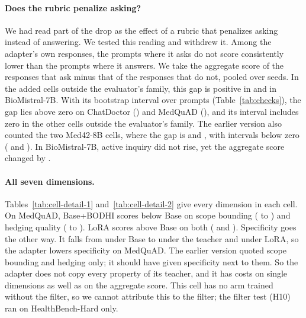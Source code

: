 \documentclass{article}
\newcommand{\bodhi}{BODHI}
\newcommand{\hbhard}{HealthBench-Hard}
\begin{document}
\paragraph{Does the rubric penalize asking?} We had read part of the drop as the effect of a
rubric that penalizes asking instead of answering. We tested this reading and withdrew it. Among
the adapter's own responses, the prompts where it asks do not score consistently lower than the
prompts where it answers. We take the aggregate score of the responses that ask minus that of
the responses that do not, pooled over seeds. In the \statGroupAddedOutsideFamilyCells{} added cells outside the evaluator's
family, this gap is positive in \statGroupAddedOutsideFamilyAskersGapLoRAUp{} and
\statHBBioMistralJulAskersGapLoRA{} in BioMistral-7B. With its bootstrap interval over prompts
(Table~\ref{tab:checks}), the gap lies above zero on ChatDoctor
(\statCDMistralJulAskersGapLoRACI) and MedQuAD (\statMQMistralJulAskersGapLoRACI), and its interval
includes zero in the other cells outside the evaluator's family. The earlier version also counted the two
Med42-8B cells, where the gap is \statHBMedFortyTwoJulAskersGapLoRA{} and
\statCDMedFortyTwoJulAskersGapLoRA, with intervals below zero
(\statHBMedFortyTwoJulAskersGapLoRACI{} and \statCDMedFortyTwoJulAskersGapLoRACI). In BioMistral-7B,
active inquiry did not rise, yet the aggregate score changed by \statHBBioMistralJulRubricScoreLoRAvsBaseDiff.

\paragraph{All seven dimensions.} Tables~\ref{tab:cell-detail-1} and~\ref{tab:cell-detail-2}
give every dimension in each cell. On MedQuAD, Base+\bodhi{}
scores below Base on scope bounding (\statMQMistralJulScopeBoundingBase{} to
\statMQMistralJulScopeBoundingBaseBodhi) and hedging quality
(\statMQMistralJulHedgingQualityBase{} to \statMQMistralJulHedgingQualityBaseBodhi). LoRA
scores above Base on both (\statMQMistralJulScopeBoundingLoRA{} and
\statMQMistralJulHedgingQualityLoRA). Specificity goes the other way. It falls from
\statMQMistralJulSpecificityBase{} under Base to \statMQMistralJulSpecificityBaseBodhi{}
under the teacher and \statMQMistralJulSpecificityLoRA{} under LoRA, so the adapter lowers
specificity on MedQuAD. The earlier version quoted scope bounding and hedging only; it should
have given specificity next to them. So the adapter does not copy every property of its teacher,
and it has costs on single dimensions as well as on the aggregate score. This cell has no arm
trained without the filter, so we cannot attribute this to the filter; the filter test (H10) ran on
\hbhard{} only.
\end{document}

